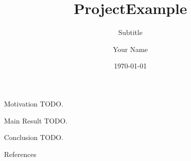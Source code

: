 \documentclass[11pt,english,aspectratio=169]{beamer}
\title{ProjectExample}
\subtitle{Subtitle}
\author{Your Name}
\date{\today}
\begin{document}
\maketitle

\begin{frame}{Motivation}
    TODO.
\end{frame}

\begin{frame}{Main Result}
    TODO.
\end{frame}

\begin{frame}{Conclusion}
    TODO.
\end{frame}

\appendix

\begin{frame}[allowframebreaks]{References}
    \printbibliography
\end{frame}
\end{document}
